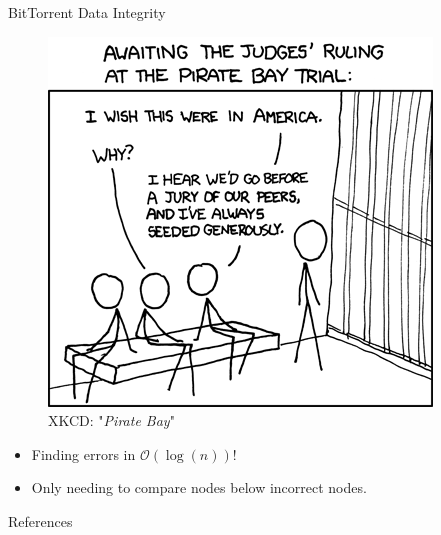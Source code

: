 \documentclass{beamer}
\begin{document}
\begin{frame}{BitTorrent Data Integrity}
	\begin{multicols}{2}
		\begin{figure}
			\includegraphics[width=.45\textwidth]{../Images/pirate_bay.png}
			\caption{XKCD: "\textit{Pirate Bay}" \cite{xkcd-pirate-bay}}
		\end{figure}
		
		\columnbreak
		
		\null \vfill
		\begin{itemize}
			\item Finding errors in $\mathcal{O}(\log(n))$!
			\item Only needing to compare nodes below incorrect nodes.
		\end{itemize}
		\vfill \null
	\end{multicols}
\end{frame}

\begin{frame}[allowframebreaks]{References}
\printbibliography
\end{frame}
\end{document}
